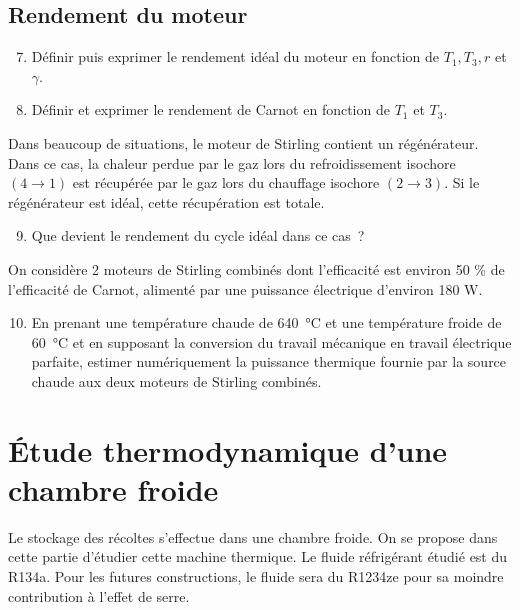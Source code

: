 \documentclass[a4paper, 12pt, garamond]{book}
\begin{document}
\subsection{Rendement du moteur}

\begin{enumerate}
	\setcounter{enumi}{6}
	\item
	      Définir puis exprimer le rendement idéal du moteur en fonction de
	      \(T_1 , T_3 , r\) et \(\gamma\).
	\item
	      Définir et exprimer le rendement de Carnot en fonction de \(T_1\) et
	      \(T_3\).
\end{enumerate}

Dans beaucoup de situations, le moteur de Stirling contient un
régénérateur. Dans ce cas, la chaleur perdue par le gaz lors du
refroidissement isochore \((4 \to 1)\) est récupérée par le gaz lors du
chauffage isochore \((2 \to 3)\). Si le régénérateur est idéal, cette
récupération est totale.

\begin{enumerate}
	\setcounter{enumi}{8}
	\item
	      Que devient le rendement du cycle idéal dans ce cas~?
\end{enumerate}

On considère 2 moteurs de Stirling combinés dont l'efficacité est
environ 50 \% de l'efficacité de Carnot, alimenté par une puissance
électrique d'environ 180 W.

\begin{enumerate}
	\setcounter{enumi}{9}
	\item
	      En prenant une température chaude de \SI{640}{\degreeCelsius} et une
	      température froide de \SI{60}{\degreeCelsius} et en supposant la
	      conversion du travail mécanique en travail électrique parfaite, estimer
	      numériquement la puissance thermique fournie par la source chaude aux
	      deux moteurs de Stirling combinés.
\end{enumerate}

\newpage

\section{Étude thermodynamique d'une chambre froide}

Le stockage des récoltes s'effectue dans une chambre froide. On se
propose dans cette partie d'étudier cette machine thermique. Le fluide
réfrigérant étudié est du R134a. Pour les futures constructions, le
fluide sera du R1234ze pour sa moindre contribution à l'effet de serre.
\end{document}
